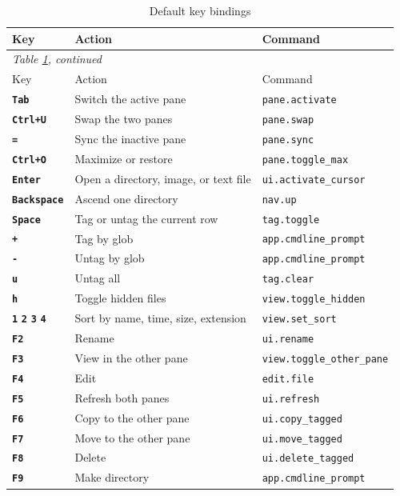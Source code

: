 \documentclass[tm]{ornltm}
\newcommand{\key}[1]{\textbf{\texttt{#1}}}
\begin{document}
\begin{small}
\begin{longtable}{p{} p{} p{}}
  \caption{Default key bindings}
  \label{tab:allkeys} \\
  \toprule
  Key & Action & Command \\
  \midrule
  \endfirsthead
  \multicolumn{3}{l}{\emph{Table \ref{tab:allkeys}, continued}} \\
  \toprule
  Key & Action & Command \\
  \midrule
  \endhead
  \bottomrule
  \endfoot
  \key{Tab} & Switch the active pane & \texttt{pane.activate} \\
  \key{Ctrl+U} & Swap the two panes & \texttt{pane.swap} \\
  \key{=} & Sync the inactive pane & \texttt{pane.sync} \\
  \key{Ctrl+O} & Maximize or restore & \texttt{pane.toggle\_max} \\
  \key{Enter} & Open a directory, image, or text file &
    \texttt{ui.activate\_cursor} \\
  \key{Backspace} & Ascend one directory & \texttt{nav.up} \\
  \key{Space} & Tag or untag the current row & \texttt{tag.toggle} \\
  \key{+} & Tag by glob & \texttt{app.cmdline\_prompt} \\
  \key{-} & Untag by glob & \texttt{app.cmdline\_prompt} \\
  \key{u} & Untag all & \texttt{tag.clear} \\
  \key{h} & Toggle hidden files & \texttt{view.toggle\_hidden} \\
  \key{1} \key{2} \key{3} \key{4} & Sort by name, time, size, extension &
    \texttt{view.set\_sort} \\
  \key{F2} & Rename & \texttt{ui.rename} \\
  \key{F3} & View in the other pane & \texttt{view.toggle\_other\_pane} \\
  \key{F4} & Edit & \texttt{edit.file} \\
  \key{F5} & Refresh both panes & \texttt{ui.refresh} \\
  \key{F6} & Copy to the other pane & \texttt{ui.copy\_tagged} \\
  \key{F7} & Move to the other pane & \texttt{ui.move\_tagged} \\
  \key{F8} & Delete & \texttt{ui.delete\_tagged} \\
  \key{F9} & Make directory & \texttt{app.cmdline\_prompt} \\

\end{longtable}
\end{small}
\end{document}
